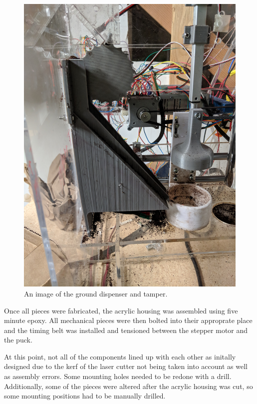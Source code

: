 \documentclass[conference]{IEEEtran}
\begin{document}
\begin{figure}
  \centering
    \includegraphics[width=1\columnwidth]{chuteAndTamper}
    \caption{An image of the ground dispenser and tamper.}
\end{figure}

Once all pieces were fabricated, the acrylic housing was assembled using five
minute epoxy. All mechanical pieces were then bolted into their approprate place
and the timing belt was installed and tensioned between the stepper motor and
the puck.

At this point, not all of the components lined up with each other as initally
designed due to the kerf of the laser cutter not being taken into account 
as well as assembly errors. Some mounting
holes needed to be redone with a drill. Additionally, some of the pieces were
altered after the acrylic housing was cut, so some mounting positions had to be
manually drilled.
\end{document}
